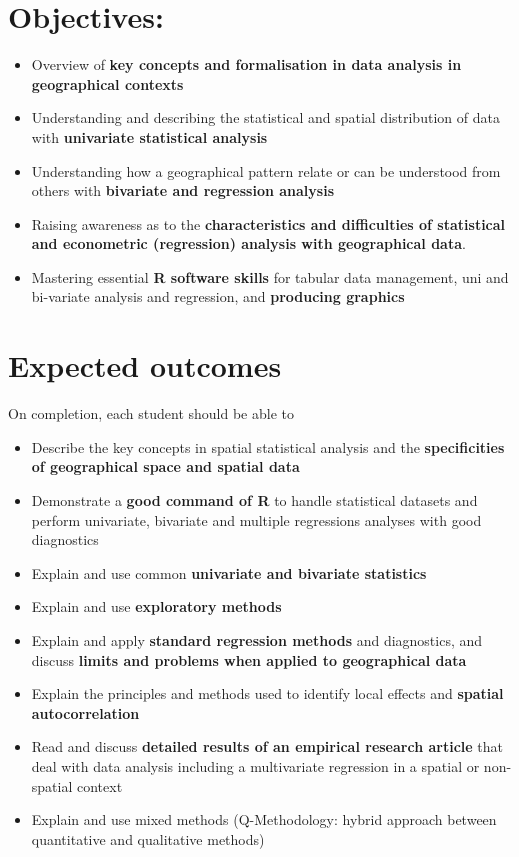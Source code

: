 \documentclass[
  letterpaper,
  DIV=11,
  numbers=noendperiod]{scrreprt}
\providecommand{\tightlist}{%
  \setlength{\itemsep}{0pt}\setlength{\parskip}{0pt}}\usepackage{longtable,booktabs,array}
\begin{document}
\section*{Objectives:}\label{objectives}


\begin{itemize}
\tightlist
\item
  Overview of \textbf{key concepts and formalisation in data analysis in
  geographical contexts}
\item
  Understanding and describing the statistical and spatial distribution
  of data with \textbf{univariate statistical analysis}
\item
  Understanding how a geographical pattern relate or can be understood
  from others with \textbf{bivariate and regression analysis}
\item
  Raising awareness as to the \textbf{characteristics and difficulties
  of statistical and econometric (regression) analysis with geographical
  data}.
\item
  Mastering essential \textbf{R software skills} for tabular data
  management, uni and bi-variate analysis and regression, and
  \textbf{producing graphics}
\end{itemize}

\section*{Expected outcomes}\label{expected-outcomes}


On completion, each student should be able to

\begin{itemize}
\tightlist
\item
  Describe the key concepts in spatial statistical analysis and the
  \textbf{specificities of geographical space and spatial data}
\item
  Demonstrate a \textbf{good command of R} to handle statistical
  datasets and perform univariate, bivariate and multiple regressions
  analyses with good diagnostics
\item
  Explain and use common \textbf{univariate and bivariate statistics}
\item
  Explain and use \textbf{exploratory methods}
\item
  Explain and apply \textbf{standard regression methods} and
  diagnostics, and discuss \textbf{limits and problems when applied to
  geographical data}
\item
  Explain the principles and methods used to identify local effects and
  \textbf{spatial autocorrelation}
\item
  Read and discuss \textbf{detailed results of an empirical research
  article} that deal with data analysis including a multivariate
  regression in a spatial or non-spatial context
\item
  Explain and use mixed methods (Q-Methodology: hybrid approach between
  quantitative and qualitative methods)
\end{itemize}
\end{document}
